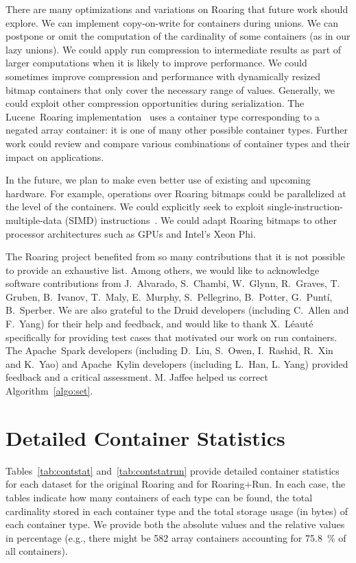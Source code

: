 \documentclass[times]{speauth}
\begin{document}
There are many optimizations and variations on Roaring that future
work should explore. We can implement copy-on-write for containers during unions. We can postpone or omit the computation of the cardinality of some containers (as in our lazy unions). 
We could apply run compression to intermediate results as part of
larger computations when it is likely to improve performance.
We could sometimes improve compression and performance with dynamically resized bitmap containers that only cover the necessary range of values. 
Generally, we could exploit other compression opportunities during serialization.
The Lucene~Roaring implementation~\cite{RoaringDocIdSet} uses a container type 
corresponding to a negated array container: it is one of many other possible container types. Further work could review and 
compare various combinations of container types and their impact on applications.

In the future, we plan to make even better use of existing
and upcoming hardware. For example, operations over Roaring bitmaps could be parallelized at the level of the containers. We could
explicitly seek to exploit single-instruction-multiple-data (SIMD) instructions~\cite{simdcompandinter,lemireboytsov2013decoding}. We could adapt Roaring bitmaps to other processor
architectures such as GPUs and Intel's Xeon Phi.





\ack The Roaring project benefited from so many contributions
that it is not possible to provide an exhaustive list.
Among others, we would like to acknowledge software contributions from  
J.~Alvarado, S.~Chambi, W.~Glynn, R.~Graves, T. Gruben,  B.~Ivanov, T.~Maly, E.~Murphy,  S.~Pellegrino, B.~Potter, G.~Punt\'i, B.~Sperber. We are also grateful to the Druid developers 
(including C.~Allen and F.~Yang) for their help and feedback,
and would like to thank  X.~L\'eaut\'e specifically for providing test cases that motivated our work on run containers. The Apache~Spark
developers (including D.~Liu, S.~Owen, I.~Rashid, R.~Xin and K.~Yao) and Apache~Kylin developers (including L.~Han, L. Yang) provided feedback and a critical assessment. M. Jaffee  helped us correct Algorithm~\ref{algo:set}.

\clearpage



\appendix

\section{Detailed Container Statistics}
\label{app:detailedstat}
Tables~\ref{tab:contstat} and~\ref{tab:contstatrun} provide detailed container statistics for each dataset for the original Roaring and for Roaring+Run. In each case, the tables indicate how many containers of each type can be found, the total cardinality stored in each container type and the total storage usage (in bytes) of each container type. We provide both the absolute values and the relative values in percentage (e.g., there might be 582 array containers accounting for \SI{75.8}{\percent} of all containers).
\end{document}
